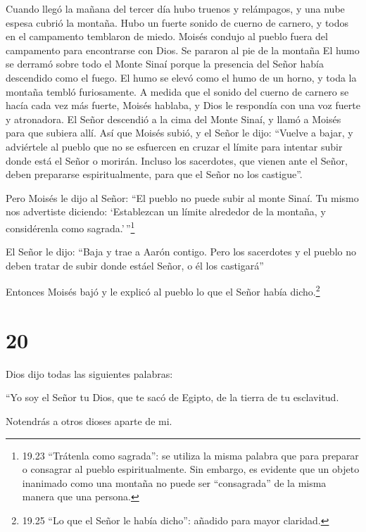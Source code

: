  Cuando llegó la mañana del tercer día hubo truenos y
relámpagos, y una nube espesa cubrió la montaña. Hubo un fuerte sonido
de cuerno de carnero, y todos en el campamento temblaron de miedo.
 Moisés condujo al pueblo fuera del campamento para
encontrarse con Dios. Se pararon al pie de la montaña  El
humo se derramó sobre todo el Monte Sinaí porque la presencia del Señor
había descendido como el fuego. El humo se elevó como el humo de un
horno, y toda la montaña tembló furiosamente.  A medida que
el sonido del cuerno de carnero se hacía cada vez más fuerte, Moisés
hablaba, y Dios le respondía con una voz fuerte y atronadora.
 El Señor descendió a la cima del Monte Sinaí, y llamó a
Moisés para que subiera allí. Así que Moisés subió,  y el
Señor le dijo: ``Vuelve a bajar, y adviértele al pueblo que no se
esfuercen en cruzar el límite para intentar subir donde está el Señor o
morirán.  Incluso los sacerdotes, que vienen ante el Señor,
deben prepararse espiritualmente, para que el Señor no los castigue''.

 Pero Moisés le dijo al Señor: ``El pueblo no puede subir
al monte Sinaí. Tu mismo nos advertiste diciendo: `Establezcan un límite
alrededor de la montaña, y considérenla como sagrada.'\,''\footnote{19.23
  ``Trátenla como sagrada'': se utiliza la misma palabra que para
  preparar o consagrar al pueblo espiritualmente. Sin embargo, es
  evidente que un objeto inanimado como una montaña no puede ser
  ``consagrada'' de la misma manera que una persona.}

 El Señor le dijo: ``Baja y trae a Aarón contigo. Pero los
sacerdotes y el pueblo no deben tratar de subir donde estáel Señor, o él
los castigará''

 Entonces Moisés bajó y le explicó al pueblo lo que el
Señor había dicho.\footnote{19.25 ``Lo que el Señor le había dicho'':
  añadido para mayor claridad.}

\hypertarget{section-19}{%
\section{20}\label{section-19}}

 Dios dijo todas las siguientes palabras:

 ``Yo soy el Señor tu Dios, que te sacó de Egipto, de la
tierra de tu esclavitud.

 Notendrás a otros dioses aparte de mi.

